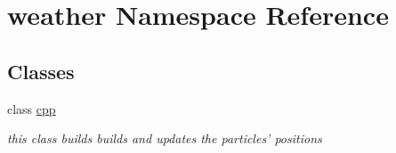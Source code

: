 \hypertarget{namespaceweather}{
\section{weather Namespace Reference}
\label{namespaceweather}
}
\subsection*{Classes}
\begin{DoxyCompactItemize}
\item 
class \hyperlink{classweather_1_1cpp}{cpp}
\begin{DoxyCompactList}\small\item\em this class builds builds and updates the particles' positions \item\end{DoxyCompactList}\end{DoxyCompactItemize}
